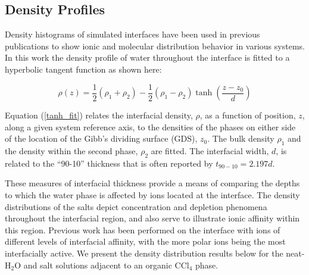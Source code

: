 \subsection{Density Profiles}

Density histograms of simulated interfaces have been used in previous publications to show ionic and molecular distribution behavior in various systems.\cite{Chang1995,Eggimann2008,Du2008,Wick2006c,Petersen2005a,Hore2008,Walker2006b,Walker2007b} In this work the density profile of water throughout the interface is fitted to a hyperbolic tangent function\cite{Wick2006c,MATSUMOTO1988} as shown here:

\begin{equation}\label{tanh_fit}
	\rho(z) = \frac12(\rho_1+\rho_2) - \frac12\left(\rho_1-\rho_2\right)\tanh\left(\frac{z-z_0}{d}\right)
\end{equation}

Equation (\ref{tanh_fit}) relates the interfacial density, $\rho$, as a function of position, $z$, along a given system reference axis, to the densities of the phases on either side of the location of the Gibb's dividing surface (GDS), $z_0$. The bulk density $\rho_1$ and the density within the second phase, $\rho_2$ are fitted.  The interfacial width, $d$, is related to the ``90-10'' thickness that is often reported by $t_{90-10} = 2.197d$.

These measures of interfacial thickness provide a means of comparing the depths to which the water phase is affected by ions located at the interface. The density distributions of the salts depict concentration and depletion phenomena throughout the interfacial region, and also serve to illustrate ionic affinity within this region. Previous work has been performed on the \airwat interface with ions of different levels of interfacial affinity, with the more polar ions being the most interfacially active.\cite{Luo2006,Petersen2006,Petersen2005a,Allen2009,Hofft2006,Beattie2005,Bian2009,Dang2004b} We present the density distribution results below for the neat-H$_2$O and salt solutions adjacent to an organic CCl$_4$ phase. %


